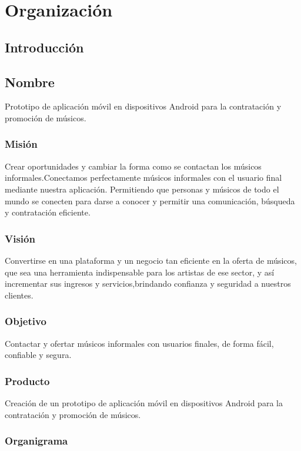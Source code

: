 \chapter{Organización}

\section{Introducción}

\section{Nombre}
Prototipo de aplicación móvil en dispositivos Android para la contratación y promoción de músicos.
\subsection{Misión}
Crear oportunidades y cambiar la forma como se contactan los músicos informales.Conectamos perfectamente músicos informales con el usuario final mediante nuestra aplicación. Permitiendo que personas y músicos de todo el mundo se conecten para darse a conocer y permitir una comunicación, búsqueda y contratación eficiente.
\subsection{Visión}
Convertirse en una plataforma y un negocio tan eficiente en la oferta de músicos, que sea una herramienta indispensable para los artistas de ese sector, y así incrementar sus ingresos y servicios,brindando confianza y seguridad a nuestros clientes.
\subsection{Objetivo}
Contactar y ofertar músicos informales con usuarios finales, de forma fácil, confiable y segura.
\newpage
\subsection{Producto}
Creación de un prototipo de aplicación móvil en dispositivos Android para la contratación y promoción de músicos.
\subsection{Organigrama}
